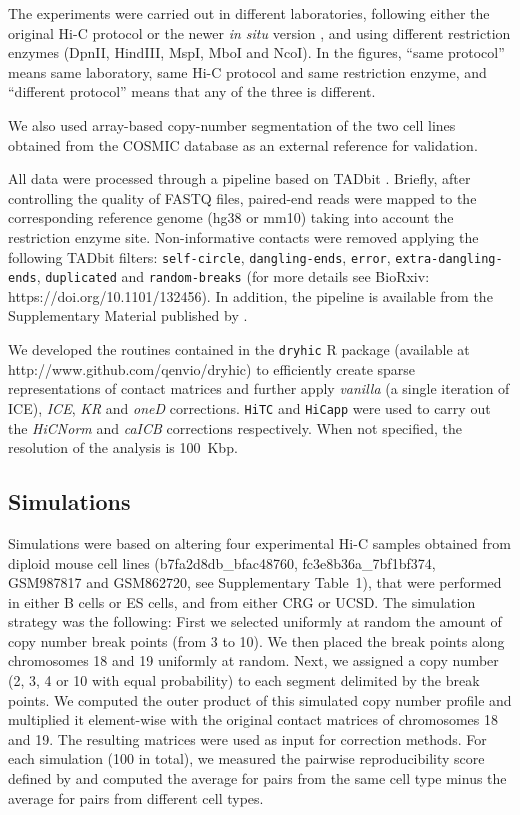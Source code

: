 \documentclass[a4,center,fleqn]{NAR}
\begin{document}
The experiments were carried out in different laboratories, following
either the original Hi-C protocol \citep{lieberman2009comprehensive} or
the newer \textit{in situ} version \citep{rao20143d}, and using different
restriction enzymes (DpnII, HindIII, MspI, MboI and NcoI). In the figures,
``same protocol'' means same laboratory, same Hi-C protocol and same
restriction enzyme, and ``different protocol'' means that any of the three
is different.

We also used array-based copy-number segmentation of the two cell lines
obtained from the COSMIC database \citep{forbes2010cosmic} as an external
reference for validation.


All data were processed through a pipeline based on TADbit
\citep{serra2016structural}. Briefly, after controlling the quality of
FASTQ files, paired-end reads were mapped to the corresponding reference
genome (hg38 or mm10) taking into account the restriction enzyme site.
Non-informative contacts were removed applying the following TADbit
filters: \texttt{self-circle}, \texttt{dangling-ends}, \texttt{error},
\texttt{extra-dangling-ends}, \texttt{duplicated} and
\texttt{random-breaks} (for more details see BioRxiv:
https://doi.org/10.1101/132456). In addition, the pipeline is available
from the Supplementary Material published by \cite{quilez2017managing}.

We developed the routines contained in the \texttt{dryhic} R package
(available at http://www.github.com/qenvio/dryhic) to efficiently create
sparse representations of contact matrices and further apply
\textit{vanilla} (a single iteration of ICE), \textit{ICE}, \textit{KR} and \textit{oneD} corrections.
\texttt{HiTC} \citep{servant2012hitc} and \texttt{HiCapp}
\citep{wu2016computational} were used to carry out the \textit{HiCNorm} and
\textit{caICB} corrections respectively. When not specified, the
resolution of the analysis is 100~Kbp.

\subsection{Simulations}


Simulations were based on altering four experimental Hi-C samples obtained
from diploid mouse cell lines (b7fa2d8db\_bfac48760, fc3e8b36a\_7bf1bf374,
GSM987817 and GSM862720, see Supplementary Table~1), that were performed
in either B cells or ES cells, and from either CRG or UCSD. The simulation
strategy was the following: First we selected uniformly at random the
amount of copy number break points (from 3 to 10). We then placed the
break points along chromosomes 18 and 19 uniformly at random. Next, we
assigned a copy number (2, 3, 4 or 10 with equal probability) to each
segment delimited by the break points. We computed the outer product of
this simulated copy number profile and multiplied it element-wise with the
original contact matrices of chromosomes 18 and 19. The resulting matrices
were used as input for correction methods. For each simulation (100 in
total), we measured the pairwise reproducibility score defined by
\cite{yan2017hicspector} and computed the average for pairs from the same
cell type minus the average for pairs from different cell types.
\end{document}
